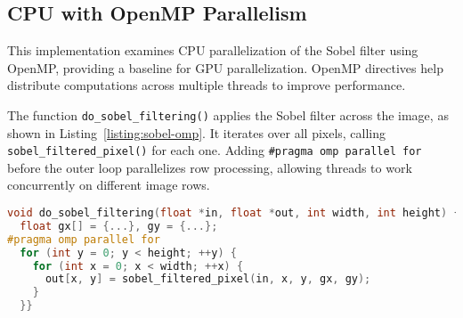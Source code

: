 \subsection{CPU with OpenMP Parallelism}
\label{subsec:cpu-omp}
This implementation examines CPU parallelization of the Sobel filter using OpenMP, providing a baseline for GPU parallelization. OpenMP directives help distribute computations across multiple threads to improve performance.

The function \texttt{do\_sobel\_filtering()} applies the Sobel filter across the image, as shown in Listing~\ref{listing:sobel-omp}. It iterates over all pixels, calling \texttt{sobel\_filtered\_pixel()} for each one. Adding \texttt{\#pragma omp parallel for} before the outer loop parallelizes row processing, allowing threads to work concurrently on different image rows.

\begin{lstlisting}[caption={\textbf{OpenMP implementation of Sobel filtering.} \texttt{do\_sobel\_filtering()} applies the Sobel filter, parallelizing the row loop with OpenMP.},label={listing:sobel-omp},float=htbp,style=mystyle,language=C++]
void do_sobel_filtering(float *in, float *out, int width, int height) {
  float gx[] = {...}, gy = {...};
#pragma omp parallel for
  for (int y = 0; y < height; ++y) {
    for (int x = 0; x < width; ++x) {
      out[x, y] = sobel_filtered_pixel(in, x, y, gx, gy);
    }
  }}
\end{lstlisting}
